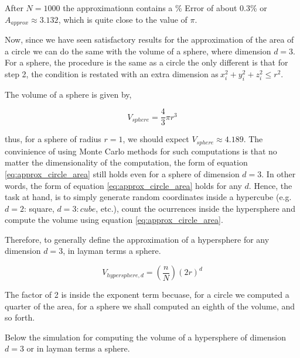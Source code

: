 \documentclass{article}
\begin{document}
After $N = 1000$ the approximationn contains a \% Error of about 0.3\% or $A_{approx} \approx 3.132$,
which is quite close to the value of $\pi$.

Now, since we have seen satisfactory results for the approximation of the area of a circle we can do the same
with the volume of a sphere, where dimension $d = 3$. For a sphere, the procedure is the same as a circle the only different is that for
step 2, the condition is restated with an extra dimension as$\ x_{i}^2 + y_{i}^2 + z_{i}^2 \leq r^2$.

The volume of a sphere is given by,

\begin{equation} \label{eq:sphere_volume}
  V_{sphere} = \frac{4}{3}\pi r^3
\end{equation}

thus, for a sphere of radius $r = 1$, we should expect $ V_{sphere} \approx 4.189$. The convinience of using Monte Carlo methods for such
computations is that no matter the dimensionality of the computation, the form of equation \ref{eq:approx_circle_area} still holds even for a sphere of
dimension $ d = 3$. In other words, the form of equation \ref{eq:approx_circle_area} holds for any $d$. Hence, the task at hand, is to simply generate random
coordinates inside a hypercube (e.g. $d = 2$: square, $d = 3:cube$, etc.), count the ocurrences inside the hypersphere and compute the volume using
equation \ref{eq:approx_circle_area}.

Therefore, to generally define the approximation of a hypersphere for any dimension $d = 3$, in layman terms a sphere.

\begin{equation} \label{eq:hypersphere_volume}
  V_{hypersphere, d} = (\frac{n}{N})(2r)^d
\end{equation}

The factor of 2 is inside the exponent term becuase, for a circle we computed a quarter of the area, for a sphere we shall computed an eighth of the volume, and
so forth.

Below the simulation for computing the volume of a hypersphere of dimension $d = 3$ or in layman terms a sphere.
\end{document}
